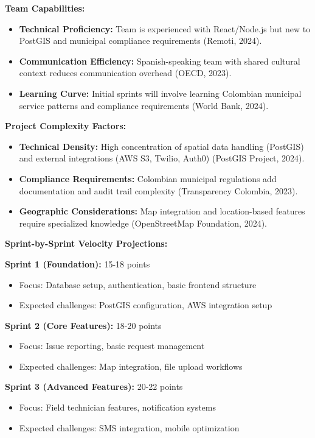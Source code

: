 \documentclass[12pt,a4paper]{article}
\begin{document}
\textbf{Team Capabilities:}
\begin{itemize}
    \item \textbf{Technical Proficiency:} Team is experienced with React/Node.js but new to PostGIS and municipal compliance requirements (Remoti, 2024).
    \item \textbf{Communication Efficiency:} Spanish-speaking team with shared cultural context reduces communication overhead (OECD, 2023).
    \item \textbf{Learning Curve:} Initial sprints will involve learning Colombian municipal service patterns and compliance requirements (World Bank, 2024).
\end{itemize}

\textbf{Project Complexity Factors:}
\begin{itemize}
    \item \textbf{Technical Density:} High concentration of spatial data handling (PostGIS) and external integrations (AWS S3, Twilio, Auth0) (PostGIS Project, 2024).
    \item \textbf{Compliance Requirements:} Colombian municipal regulations add documentation and audit trail complexity (Transparency Colombia, 2023).
    \item \textbf{Geographic Considerations:} Map integration and location-based features require specialized knowledge (OpenStreetMap Foundation, 2024).
\end{itemize}

\textbf{Sprint-by-Sprint Velocity Projections:}

\textbf{Sprint 1 (Foundation):} 15-18 points
\begin{itemize}
    \item Focus: Database setup, authentication, basic frontend structure
    \item Expected challenges: PostGIS configuration, AWS integration setup
\end{itemize}

\textbf{Sprint 2 (Core Features):} 18-20 points
\begin{itemize}
    \item Focus: Issue reporting, basic request management
    \item Expected challenges: Map integration, file upload workflows
\end{itemize}

\textbf{Sprint 3 (Advanced Features):} 20-22 points
\begin{itemize}
    \item Focus: Field technician features, notification systems
    \item Expected challenges: SMS integration, mobile optimization
\end{itemize}
\end{document}

